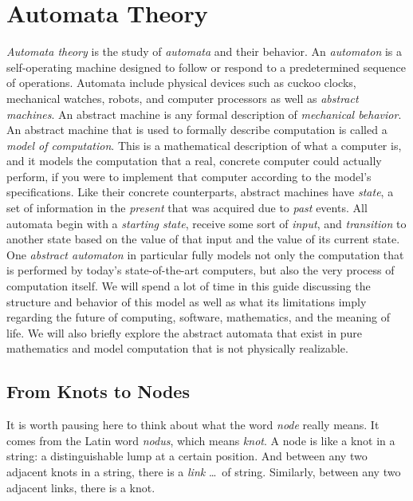 \chapter{Automata Theory}

\textit{Automata theory} is the study of \textit{automata} and their behavior. An \textit{automaton} is a self-operating machine designed to follow or respond to a predetermined sequence of operations. Automata include physical devices such as cuckoo clocks, mechanical watches, robots, and computer processors as well as \textit{abstract machines}. An abstract machine is any formal description of \textit{mechanical behavior}. An abstract machine that is used to formally describe computation is called a \textit{model of computation}. This is a mathematical description of what a computer is, and it models the computation that a real, concrete computer could actually perform, if you were to implement that computer according to the model's specifications. Like their concrete counterparts, abstract machines have \textit{state}, a set of information in the \textit{present} that was acquired due to \textit{past} events. All automata begin with a \textit{starting state}, receive some sort of \textit{input}, and \textit{transition} to another state based on the value of that input and the value of its current state. \\

One \textit{abstract automaton} in particular fully models not only the computation that is performed by today's state-of-the-art computers, but also the very process of computation itself. We will spend a lot of time in this guide discussing the structure and behavior of this model as well as what its limitations imply regarding the future of computing, software, mathematics, and the meaning of life. We will also briefly explore the abstract automata that exist in pure mathematics and model computation that is not physically realizable. \\

\section{From Knots to Nodes}

It is worth pausing here to think about what the word \textit{node} really means. It comes from the Latin word \textit{nodus}, which means \textit{knot}. A node is like a knot in a string: a distinguishable lump at a certain position. And between any two adjacent knots in a string, there is a \textit{link} \dots\ of string. Similarly, between any two adjacent links, there is a knot. \\

